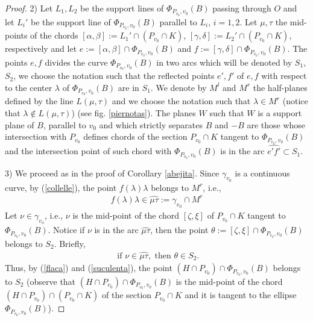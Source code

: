\documentclass[12pt]{amsart}
\begin{document}
\begin{proof}
                    2) Let $L_1,L_2$ be the support lines of 
                   $\Phi_{P_{v_0}, {v_0}}(B)$ passing through $O$ and let $L_i'$ be the support line of 
                   $\Phi_{P_{v_0}, {v_0}}(B)$ parallel to $L_i$, $i=1,2$. Let $\mu,\tau$ the mid-points of 
                   the chords $[\alpha, \beta]:=L_1'\cap (P_{v_0}\cap K)$, 
                   $[\gamma, \delta]:=L_2'\cap (P_{v_0}\cap K)$, respectively and let 
                   $e:=[\alpha, \beta] \cap \Phi_{P_{v_0}, {v_0}}(B)$ and 
                   $f:=[\gamma, \delta] \cap \Phi_{P_{v_0}, {v_0}}(B)$. The 
                   points $e,f$ divides the curve $\Phi_{P_{v_0}, {v_0}}(B)$ in two arcs which will be 
                   denoted by $S_1$, $S_2$, we choose the notation such that the reflected points 
                   $ e',f'$ of $e,f$ with respect to the center $\lambda$ of $\Phi_{P_{v_0}, {v_0}}(B)$ are 
                   in $S_1$. We denote by $M^l$ and $M^r$ the half-planes defined by the line 
                   $L( \mu,\tau)$ and we choose the notation such that $\lambda \in M^r$ (notice that 
                   $\lambda\notin L( \mu,\tau)$) (see fig. \ref{piernotas}). The planes $W$ such that $W$ 
                   is a support plane of $B$, parallel to $v_{0}$ and which strictly separates $B$ and $-B$ 
                   are those whose intersection with $P_{v_0}$ defines chords of the section 
                   $P_{v_0}\cap K$ tangent to $\Phi_{P_{v_0}, {v_0}}(B)$ and the intersection point of 
                   such chord with $\Phi_{P_{v_0}, {v_0}}(B)$ is in the arc $\widehat{e'f'}\subset S_1$.
                   
                   3) We proceed as in the proof of Corollary \ref{abejita}. Since $\gamma_{v_0}$ is 
                   a continuous curve, by (\ref{collelle}),  the point 
                   $f(\lambda) \lambda$ belongs to $M^r$, i.e., 
\begin{eqnarray}\label{flaca}
f(\lambda) \lambda \in \widehat{\mu\tau}:=\gamma_{v_0}\cap M^r
\end{eqnarray}                           
                   Let $\nu\in \gamma_{v_o}$, i.e., $\nu$ is the mid-point of the chord $[\zeta,\xi]$ of 
                   $P_{v_0}\cap K$ tangent to $\Phi_{P_{v_0}, {v_0}}(B)$. Notice if $\nu$ is in the arc 
                   $\widehat{\mu\tau}$, then the point $\theta:=[\zeta,\xi]\cap \Phi_{P_{v_0}, {v_0}}(B)$ 
                   belongs to $S_2$. Briefly,
\begin{eqnarray}\label{suculenta}
\textrm{ if }\nu \in \widehat{\mu\tau},\textrm{  then }\theta \in S_2.            
\end{eqnarray}                   
                   Thus, by (\ref{flaca}) and (\ref{suculenta}), the point 
                   $(H\cap P_{v_0})\cap \Phi_{P_{v_0}, {v_0}}(B)$ belongs to $S_2$ (observe that 
                   $(H\cap P_{v_0})\cap \Phi_{P_{v_0}, {v_0}}(B)$ is the mid-point of the chord 
                   $(H\cap P_{v_0})\cap  (P_{v_0}\cap K)$ of the section $P_{v_0}\cap K$ and it is tangent 
                   to the ellipse $\Phi_{P_{v_0}, {v_0}}(B)$).  
                   

\end{proof}
\end{document}
